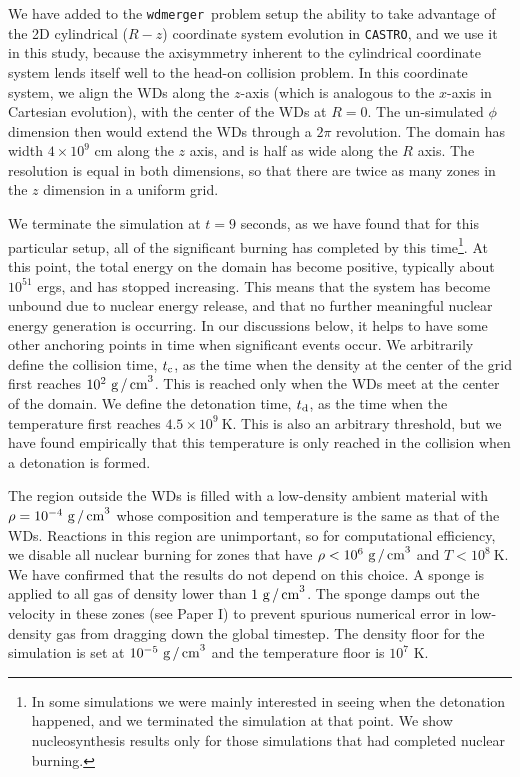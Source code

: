 \documentclass[twocolumn,numberedappendix]{../aastex6}
\newcommand{\castro}{\texttt{CASTRO}}
\newcommand{\wdmerger}{\texttt{wdmerger}}
\begin{document}
We have added to the \wdmerger\ problem setup the ability to take advantage of 
the 2D cylindrical ($R-z$) coordinate system evolution in \castro, and we use it
in this study, because the axisymmetry inherent to the cylindrical coordinate system
lends itself well to the head-on collision problem. In this coordinate system, we
align the WDs along the $z$-axis (which is analogous to the $x$-axis in Cartesian
evolution), with the center of the WDs at $R = 0$. The un-simulated $\phi$ dimension
then would extend the WDs through a $2\pi$ revolution. The domain has width $4 \times 10^{9}$
cm along the $z$ axis, and is half as wide along the $R$ axis. The resolution is equal
in both dimensions, so that there are twice as many zones in the $z$ dimension in
a uniform grid.

We terminate the simulation at $t = 9$ seconds, as we have found that for this
particular setup, all of the significant burning has completed by this time\footnote{In
some simulations we were mainly interested in seeing when the detonation happened, and
we terminated the simulation at that point. We show nucleosynthesis results only for
those simulations that had completed nuclear burning.}. At
this point, the total energy on the domain has become positive, typically about
$10^{51}$ ergs, and has stopped increasing. This means that the system has become
unbound due to nuclear energy release, and that no further meaningful nuclear energy
generation is occurring. In our discussions below, it helps to have some other
anchoring points in time when significant events occur. We arbitrarily define the
collision time, $t_{\rm c}$, as the time when the density at the center of the grid
first reaches $10^2\ \text{g\,/\,cm}^3$. This is reached only when the WDs meet at the
center of the domain. We define the detonation time, $t_{\rm d}$, as the time when the
temperature first reaches $4.5 \times 10^9\ \text{K}$. This is also an arbitrary
threshold, but we have found empirically that this temperature is only reached in
the collision when a detonation is formed.

The region outside the WDs is filled with a low-density ambient
material with $\rho = 10^{-4}\ \text{g\,/\,cm}^{3}$ whose composition and temperature is the
same as that of the WDs. Reactions in this region are unimportant, so for
computational efficiency, we disable all nuclear burning for zones that have
$\rho < 10^6\ \text{g\,/\,cm}^{3}$ and $T < 10^8\ \text{K}$. We have confirmed that
the results do not depend on this choice. A sponge is applied to all gas of density
lower than $1\ \text{g\,/\,cm}^{3}$. The sponge damps out the velocity in these zones
(see Paper I) to prevent spurious numerical error in low-density gas from dragging
down the global timestep. The density floor for the simulation is set
at $10^{-5}\ \text{g\,/\,cm}^{3}$ and the temperature floor is $10^7$ K.
\end{document}
